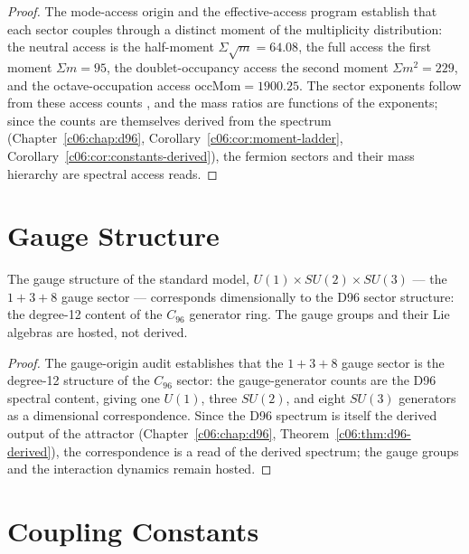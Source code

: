 \begin{proof}
The mode-access origin \cite{c11:QG150} and the effective-access program \cite{c11:QG157}
establish that each sector couples through a distinct moment of the multiplicity
distribution: the neutral access is the half-moment $\Sigma\sqrt{m} = 64.08$, the full
access the first moment $\Sigma m = 95$, the doublet-occupancy access the second
moment $\Sigma m^2 = 229$, and the octave-occupation access
$\mathrm{occMom} = 1900.25$. The sector exponents follow from these access counts
\cite{c11:QG149}, and the mass ratios are functions of the exponents; since the counts are
themselves derived from the spectrum (Chapter~\ref{c06:chap:d96},
Corollary~\ref{c06:cor:moment-ladder}, Corollary~\ref{c06:cor:constants-derived}), the
fermion sectors and their mass hierarchy are spectral access reads.
\end{proof}

\section{Gauge Structure}
\label{c11:sec:gauge}

\begin{theorem}
\label{c11:thm:gauge-structure}
The gauge structure of the standard model, $U(1)\times SU(2)\times SU(3)$ --- the
$1+3+8$ gauge sector --- corresponds dimensionally to the D96 sector structure: the
degree-12 content of the $C_{96}$ generator ring. The gauge groups and their Lie algebras
are hosted, not derived.
\end{theorem}

\begin{proof}
The gauge-origin audit \cite{c11:QG161} establishes that the $1+3+8$ gauge sector is the
degree-12 structure of the $C_{96}$ sector: the gauge-generator counts are the D96
spectral content, giving one $U(1)$, three $SU(2)$, and eight $SU(3)$ generators as a
dimensional correspondence. Since the D96 spectrum is itself the derived output of the
attractor (Chapter~\ref{c06:chap:d96}, Theorem~\ref{c06:thm:d96-derived}), the
correspondence is a read of the derived spectrum; the gauge groups and the interaction
dynamics remain hosted.
\end{proof}

\section{Coupling Constants}
\label{c11:sec:couplings}


